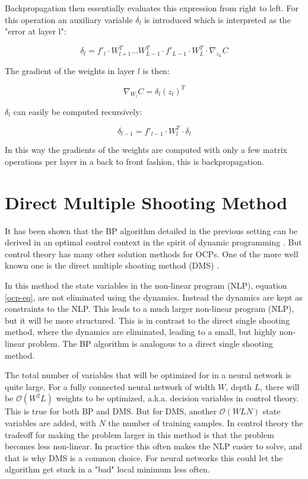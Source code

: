 Backpropagation then essentially evaluates this expression from right to left. For this operation an auxiliary variable $\delta_l$ is introduced which is interpreted as the "error at layer l":

\begin{equation}
\delta_l = f'_l \cdot W_{l+1}^T \dots W_{L-1}^T \cdot f'_{L-1} \cdot W_L^T \cdot \nabla_{z_L}C
\end{equation}

The gradient of the weights in layer $l$ is then:

\begin{equation}
\nabla_{W_l}C=\delta_l(z_l)^T
\end{equation}

$\delta_l$ can easily be computed recursively:

\begin{equation}
\delta_{l-1}  = f'_{l-1} \cdot W_l^T \cdot \delta_l
\end{equation}

In this way the gradients of the weights are computed with only a few matrix operations per layer in a back to front fashion, this is backpropagation.


\section{Direct Multiple Shooting Method}
It has been shown that the BP algorithm detailed in the previous setting can be derived in an optimal control context in the spirit of dynamic programming \cite{mizutani2000}. But control theory has many other solution methods for OCPs. One of the more well known one is the direct multiple shooting method (DMS) \cite{bock1984multiple}.

In this method the state variables in the non-linear program (NLP), equation \ref{ocp-eq}, are not eliminated using the dynamics. Instead the dynamics are kept as constraints to the NLP. This leads to a much larger non-linear program (NLP), but it will be more structured. This is in contrast to the direct single shooting method, where the dynamics are eliminated, leading to a small, but highly non-linear problem. The BP algorithm is analogous to a direct single shooting method.

The total number of variables that will be optimized for in a neural network is quite large. For a fully connected neural network of width $W$, depth $L$, there will be $\mathcal{O}(W^2L)$ weights to be optimized, a.k.a. decision variables in control theory. This is true for both BP and DMS. But for DMS, another $\mathcal{O}(WLN)$ state variables are added, with $N$ the number of training samples. In control theory the tradeoff for making the problem larger in this method is that the problem becomes less non-linear. In practice this often makes the NLP easier to solve, and that is why DMS is a common choice. For neural networks this could let the algorithm get stuck in a "bad" local minimum less often.

